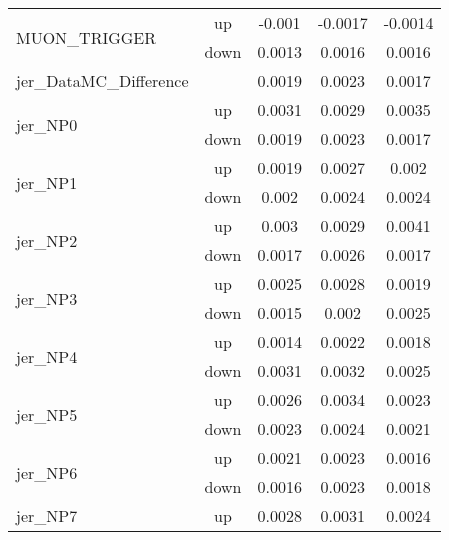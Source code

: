 \begin{table}[h!]
\begin{tabular}{lcccc}
\multirow{2}{*}{MUON\_TRIGGER}      & up   &     -0.001     &     -0.0017     &     -0.0014      \\
                                       & down &     0.0013     &     0.0016     &     0.0016       \\ \hline
\multirow{2}{*}{jer\_DataMC\_Difference}  &  & \multirow{2}{*}{0.0019} & \multirow{2}{*}{0.0023}  & \multirow{2}{*}{0.0017}  \\  \\ \hline
\multirow{2}{*}{jer\_NP0}      & up   &     0.0031     &     0.0029     &     0.0035      \\
                                       & down &     0.0019     &     0.0023     &     0.0017       \\ \hline
\multirow{2}{*}{jer\_NP1}      & up   &     0.0019     &     0.0027     &     0.002      \\
                                       & down &     0.002     &     0.0024     &     0.0024       \\ \hline
\multirow{2}{*}{jer\_NP2}      & up   &     0.003     &     0.0029     &     0.0041      \\
                                       & down &     0.0017     &     0.0026     &     0.0017       \\ \hline
\multirow{2}{*}{jer\_NP3}      & up   &     0.0025     &     0.0028     &     0.0019      \\
                                       & down &     0.0015     &     0.002     &     0.0025       \\ \hline
\multirow{2}{*}{jer\_NP4}      & up   &     0.0014     &     0.0022     &     0.0018      \\
                                       & down &     0.0031     &     0.0032     &     0.0025       \\ \hline
\multirow{2}{*}{jer\_NP5}      & up   &     0.0026     &     0.0034     &     0.0023      \\
                                       & down &     0.0023     &     0.0024     &     0.0021       \\ \hline
\multirow{2}{*}{jer\_NP6}      & up   &     0.0021     &     0.0023     &     0.0016      \\
                                       & down &     0.0016     &     0.0023     &     0.0018       \\ \hline
\multirow{2}{*}{jer\_NP7}      & up   &     0.0028     &     0.0031     &     0.0024      \\

\end{tabular}
\end{table}
